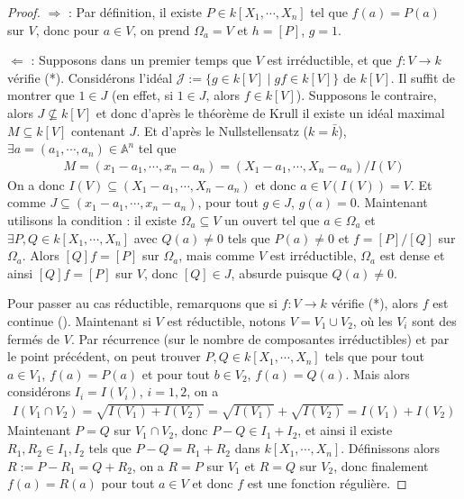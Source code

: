             \begin{proof}
                \item $\Rightarrow$ : Par définition, il existe $P \in k[X_1, \cdots, X_n]$ tel que $f(a) = P(a)$ sur $V$, donc pour $a \in V$, on prend $\Omega_a = V$ et $h = [P]$, $g = 1$.
                \item $\Leftarrow$ : Supposons dans un premier temps que $V$ est irréductible, et que $f : V \to k$ vérifie (*). Considérons l'idéal $\mathcal{J} := \{g \in k[V] \mid gf \in k[V]\}$ de $k[V]$. Il suffit de montrer que $1 \in J$ (en effet, si $1 \in J$, alors $f \in k[V]$). Supposons le contraire, alors $J \nsubseteq k[V]$ et donc d'après le théorème de Krull il existe un idéal maximal $M \subseteq k[V]$ contenant $J$. Et d'après le Nullstellensatz ($k = \bar k$), $\exists a = (a_1, \cdots, a_n) \in \mathbb{A}^n$ tel que
                \begin{align*}
                    M = (x_1 - a_1, \cdots, x_n - a_n) = (X_1 - a_1, \cdots, X_n - a_n)/I(V)
                \end{align*}
                On a donc $I(V) \subseteq (X_1 - a_1, \cdots, X_n - a_n)$ et donc $a \in V(I(V)) = V$. Et comme $J \subseteq (x_1 - a_1, \cdots, x_n - a_n)$, pour tout $g \in J$, $g(a) = 0$. Maintenant utilisons la condition : il existe $\Omega_a \subseteq V$ un ouvert tel que $a \in \Omega_a$ et $\exists P,Q \in k[X_1, \cdots, X_n]$ avec $Q(a) \neq 0$ tels que $P(a) \neq 0$ et $f = [P]/[Q]$ sur $\Omega_a$. Alors $[Q]f = [P]$ sur $\Omega_a$, mais comme $V$ est irréductible, $\Omega_a$ est dense et ainsi $[Q]f = [P]$ sur $V$, donc $[Q] \in J$, absurde puisque $Q(a) \neq 0$.
                \item Pour passer au cas réductible, remarquons que si $f : V \to k$ vérifie (*), alors $f$ est continue (). Maintenant si $V$ est réductible, notons $V = V_1 \cup V_2$, où les $V_i$ sont des fermés de $V$. Par récurrence (sur le nombre de composantes irréductibles) et par le point précédent, on peut trouver $P,Q \in k[X_1, \cdots, X_n]$ tels que pour tout $a \in V_1$, $f(a) = P(a)$ et pour tout $b \in V_2$, $f(a) = Q(a)$. Mais alors considérons $I_i = I(V_i)$, $i = 1,2$, on a
                \begin{align*}
                    I(V_1 \cap V_2) = \sqrt{I(V_1) + I(V_2)} = \sqrt{I(V_1)} + \sqrt{I(V_2)} = I(V_1) + I(V_2)
                \end{align*}
                Maintenant $P = Q$ sur $V_1 \cap V_2$, donc $P - Q \in I_1 + I_2$, et ainsi il existe $R_1, R_2 \in I_1, I_2$ tels que $P - Q = R_1 + R_2$ dans $k[X_1, \cdots, X_n]$. Définissons alors $R := P - R_1 = Q + R_2$, on a $R = P$ sur $V_1$ et $R = Q$ sur $V_2$, donc finalement $f(a) = R(a)$ pour tout $a \in V$ et donc $f$ est une fonction régulière.
            \end{proof}
